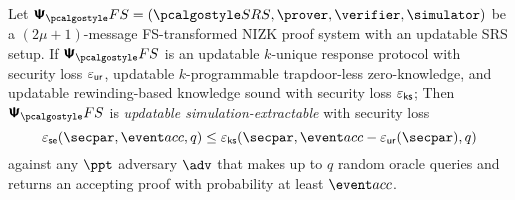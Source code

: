 
\begin{theorem}
	\label{thm:se}
	Let $\psfs = (\SRScer, \prover, \verifier, \simulator)$ be a  $(2\mu + 1)$-message FS-transformed NIZK proof system with an updatable SRS setup. If $\psfs$ is an
	updatable $k$-unique response protocol with security loss $\varepsilon_{\mathsf{ur}}$,
	updatable $k$-programmable trapdoor-less zero-knowledge, and %
	updatable rewinding-based knowledge sound with security loss $\varepsilon_{\mathsf{ks}}$; 
	Then $\psfs$ is \emph{updatable simulation-extractable} with security loss $$\epsse(\secpar,\accProb,q) \leq \epscss(\secpar,\accProb - \epsur(\secpar),q)$$ against any $\ppt$ adversary $\advse$ that makes up to $q$ random oracle queries and returns an accepting proof with probability at least $\accProb$.
\end{theorem}

